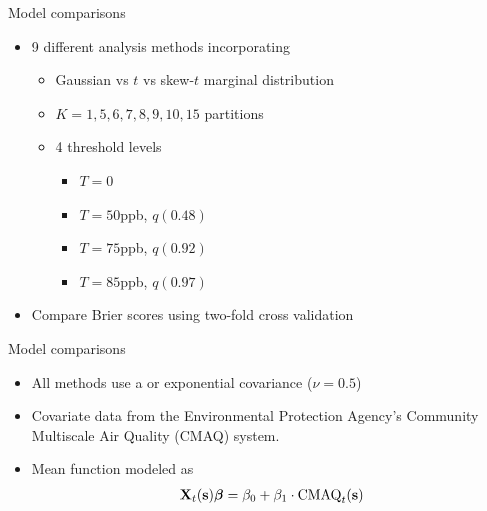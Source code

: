 \documentclass{beamer}
\begin{document}
\begin{frame}{Model comparisons}
  \begin{itemize} \setlength{\itemsep}{0.5em}
    \item 9 different analysis methods incorporating
    \begin{itemize}
      \item Gaussian vs $t$ vs skew-$t$ marginal distribution
      \item $K=1, 5, 6, 7, 8, 9, 10, 15$ partitions
      \item 4 threshold levels
      \begin{itemize}
         \item $T = 0$
         \item $T = 50$ppb, $q(0.48)$
         \item $T = 75$ppb, $q(0.92)$
         \item $T = 85$ppb, $q(0.97)$
      \end{itemize}
    \end{itemize}
    \item Compare Brier scores using two-fold cross validation
  \end{itemize}
\end{frame}

\begin{frame}{Model comparisons}
  \begin{itemize} \setlength{\itemsep}{0.5em}
    \item All methods use a \Matern or exponential covariance ($\nu = 0.5$)
    \item Covariate data from the Environmental Protection Agency's Community Multiscale Air Quality (CMAQ) system.
    \item Mean function modeled as
    \begin{align*}
    	\mbox{\bf X}_t(\mbox{\bf s}) \mbox{\boldmath $\beta$} = \beta_0 + \beta_1 \cdot \text{CMAQ}_t (\mbox{\bf s})
    \end{align*}
   \end{itemize}
\end{frame}
\end{document}
